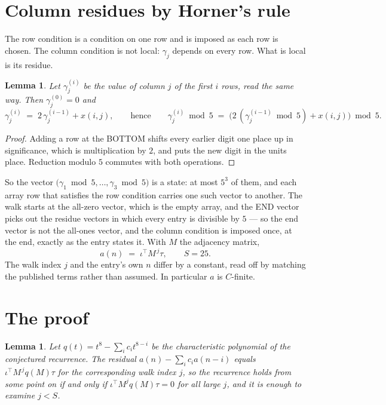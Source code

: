 \documentclass[11pt,a4paper]{article}
\theoremstyle{plain}
\newtheorem{lemma}[theorem]{Lemma}
\theoremstyle{definition}
\begin{document}
\section{Column residues by Horner's rule}

The row condition is a condition on one row and is imposed as each row is chosen. The column
condition is not local: $\gamma_j$ depends on every row. What is local is its residue.

\begin{lemma}\label{lem:horner}
Let $\gamma_j^{(i)}$ be the value of column $j$ of the first $i$ rows, read the same way.
Then $\gamma_j^{(0)}=0$ and
\[
\gamma_j^{(i)}\;=\;2\,\gamma_j^{(i-1)}+x(i,j),
\qquad\text{hence}\qquad
\gamma_j^{(i)}\bmod 5\;=\;
\bigl(2\,(\gamma_j^{(i-1)}\bmod 5)+x(i,j)\bigr)\bmod 5 .
\]
\end{lemma}

\begin{proof}
Adding a row at the BOTTOM shifts every earlier digit one place up in significance, which is
multiplication by $2$, and puts the new digit in the units place. Reduction modulo
$5$ commutes with both operations.
\end{proof}

So the vector $\bigl(\gamma_1\bmod 5,\dots,\gamma_{3}\bmod
5\bigr)$ is a state: at most $5^{3}$ of them, and each array row
that satisfies the row condition carries one such vector to another. The walk starts at the
all-zero vector, which is the empty array, and the END vector picks out the residue vectors in
which every entry is divisible by $5$ --- so the end vector is not the all-ones
vector, and the column condition is imposed once, at the end, exactly as the entry states it.
With $M$ the adjacency matrix,
\[
a(n)\;=\;\iota^{\!\top}M^{\,j}\tau ,\qquad S=25.
\]
The walk index $j$ and the entry's own $n$ differ by a constant, read off by matching the
published terms rather than assumed. In particular $a$ is $C$-finite.

\section{The proof}

\begin{lemma}\label{lem:crit}
Let $q(t)=t^{8}-\sum_i c_it^{8-i}$ be the characteristic polynomial of the
conjectured recurrence. The residual $a(n)-\sum_ic_ia(n-i)$ equals
$\iota^{\!\top}M^{\,j}q(M)\tau$ for the corresponding walk index $j$, so the recurrence
holds from some point on if and only if $\iota^{\!\top}M^{j}q(M)\tau=0$ for all large $j$,
and it is enough to examine $j<S$.
\end{lemma}
\end{document}
